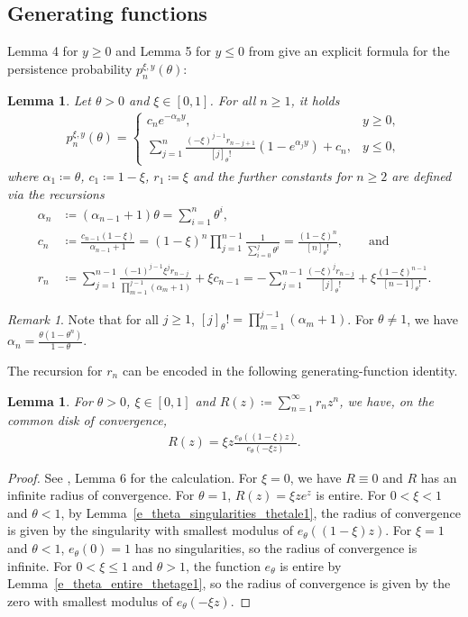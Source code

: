 \documentclass[12pt]{article}
\newcommand{\1}{\mathds{1}}
\renewcommand{\r}{\mathscr{R}}
\theoremstyle{definition}
\theoremstyle{plain}
\newtheorem{Lemma}[definition]{Lemma}
\theoremstyle{remark}
\newtheorem{Remark}{Remark}
\begin{document}
\subsection{Generating functions}
Lemma 4 for $y\geq0$ and Lemma 5 for $y\leq 0$ from \cite{AR} give an explicit formula for the persistence probability $p_n^{\xi,y}(\theta)$:
\begin{Lemma}\label{P_x_theta_positiv}
    Let $\theta>0$ and $\xi\in[0,1]$. For all $n\geq1$, it holds
        \begin{align*}
        p_n^{\xi,y}(\theta)=\begin{cases}
            c_ne^{-\alpha_ny}, & y\geq 0,
        \\
        \sum_{j=1}^n \frac{(-\xi)^{j-1} r_{n-j+1}}{[j]_\theta!} \left(1 - e^{\alpha_j y} \right)+c_n, &y\leq 0,
        \end{cases}
    \end{align*}
where $\alpha_1\coloneqq\theta$, $c_1\coloneqq 1-\xi$, $r_1\coloneqq \xi$ and the further constants for $n\ge 2$ are defined via the recursions
\begin{align*}
    \alpha_n&\coloneqq (\alpha_{n-1}+1)\theta=\sum_{i=1}^n\theta^i,
    \\c_n&\coloneqq\frac{c_{n-1}(1-\xi)}{\alpha_{n-1}+1}=(1-\xi)^n\prod_{j=1}^{n-1}\frac{1}{\sum_{i=0}^j\theta^i}=\frac{(1-\xi)^n}{[n]_\theta!},\qquad \text{and}
    \\r_n&\coloneqq\sum_{j=1}^{n-1}\frac{(-1)^{j-1}\xi^jr_{n-j}}{\prod_{m=1}^{j-1} (\alpha_m + 1)}+\xi c_{n-1}=-\sum_{j=1}^{n-1}\frac{(-\xi)^jr_{n-j}}{[j]_\theta!}+\xi\frac{(1-\xi)^{n-1}}{[n-1]_\theta!}.
\end{align*}
\end{Lemma}
\begin{Remark}
    Note that for all $j\ge 1$, $[j]_\theta!=\prod_{m=1}^{j-1} (\alpha_m + 1)$. For $\theta\neq1$, we have $\alpha_n=\frac{\theta(1-\theta^n)}{1-\theta}$.
\end{Remark}
The recursion for $r_n$ can be encoded in the following generating-function identity.
\begin{Lemma}\label{def_R}
    For $\theta>0$, $\xi\in[0,1]$ and $R(z)\coloneqq \sum_{n=1}^{\infty}r_nz^n$, we have, on the common disk of convergence,
    \begin{align*}
        R(z)=\xi z\frac{e_\theta((1-\xi)z)}{e_\theta(-\xi z)}.
    \end{align*}
\end{Lemma}
\begin{proof}
        See \cite{AR}, Lemma 6 for the calculation. For $\xi=0$, we have $R\equiv 0$ and $R$ has an infinite radius of convergence. For $\theta=1$, $R(z)=\xi ze^z$ is entire. For $0<\xi<1$ and $\theta<1$, by Lemma~\ref{e_theta_singularities_thetale1}, the radius of convergence is given by the singularity with smallest modulus of $e_\theta((1-\xi)z)$. For $\xi=1$ and $\theta<1$, $e_\theta(0)=1$ has no singularities, so the radius of convergence is infinite. For $0<\xi\le1$ and $\theta> 1$, the function $e_\theta$ is entire by Lemma~\ref{e_theta_entire_thetage1}, so the radius of convergence is given by the zero with smallest modulus of $e_\theta(-\xi z)$. 
    \end{proof}
\end{document}
